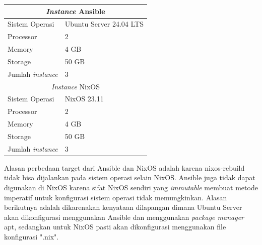 \documentclass[10pt,twoside]{report}
\begin{document}
\begin{adjustwidth}{20pt}{}
\begin{table}[!htbp]
\begin{center}
			\begin{tabular}{|l|l|}
				\hline
				\multicolumn{2}{|c|}{\textit{Instance} Ansible}    \\
				\hline
				Sistem Operasi           & Ubuntu Server 24.04 LTS \\
				\hline
				Processor                & 2                       \\
				\hline
				Memory                   & 4 GB                    \\
				\hline
				Storage                  & 50 GB                   \\
				\hline
				Jumlah \textit{instance} & 3                       \\
				\hline
				\multicolumn{2}{|c|}{\textit{Instance} NixOS}      \\
				\hline
				Sistem Operasi           & NixOS 23.11             \\
				\hline
				Processor                & 2                       \\
				\hline
				Memory                   & 4 GB                    \\
				\hline
				Storage                  & 50 GB                   \\
				\hline
				Jumlah \textit{instance} & 3                       \\
				\hline
			\end{tabular}
		\end{center}
	\end{table}
	\begin{adjustwidth}{20pt}{}
		Alasan perbedaan target dari Ansible dan NixOS adalah karena nixos-rebuild
		tidak bisa dijalankan pada sistem operasi selain NixOS. Ansible juga tidak
		dapat digunakan di NixOS karena sifat NixOS sendiri yang \textit{immutable}
		membuat metode imperatif untuk konfigurasi sistem operasi tidak memungkinkan.
		Alasan berikutnya adalah dikarenakan kenyataan dilapangan dimana Ubuntu Server
		akan dikonfigurasi menggunakan Ansible dan menggunakan \textit{package manager} apt,
		sedangkan untuk NixOS pasti akan dikonfigurasi menggunakan file konfigurasi ".nix".
	\end{adjustwidth}

\end{adjustwidth}
\end{document}
